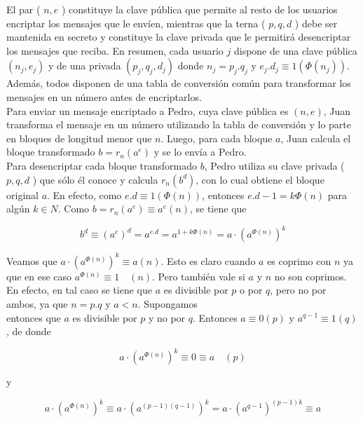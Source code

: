 \documentclass[10pt]{article}
\begin{document}
El par ( $n, e$ ) constituye la clave pública que permite al resto de los usuarios encriptar los mensajes que le envíen, mientras que la terna ( $p, q, d$ ) debe ser mantenida en secreto y constituye la clave privada que le permitirá desencriptar los mensajes que reciba. En resumen, cada usuario $j$ dispone de una clave pública $\left(n_{j}, e_{j}\right)$ y de una privada $\left(p_{j}, q_{j}, d_{j}\right)$ donde $n_{j}=p_{j} . q_{j}$ y $e_{j} . d_{j} \equiv 1\left(\Phi\left(n_{j}\right)\right)$. Además, todos disponen de una tabla de conversión común para transformar los mensajes en un número antes de encriptarlos.\\
Para enviar un mensaje encriptado a Pedro, cuya clave pública es $(n, e)$, Juan transforma el mensaje en un número utilizando la tabla de conversión y lo parte en bloques de longitud menor que $n$. Luego, para cada bloque $a$, Juan calcula el bloque transformado $b=r_{n}\left(a^{e}\right)$ y se lo envía a Pedro.\\
Para desencriptar cada bloque transformado $b$, Pedro utiliza su clave privada ( $p, q, d$ ) que sólo él conoce y calcula $r_{n}\left(b^{d}\right)$, con lo cual obtiene el bloque original $a$. En efecto, como $e . d \equiv 1(\Phi(n))$, entonces $e . d-1=k \Phi(n)$ para algún $k \in N$. Como $b=r_{n}\left(a^{e}\right) \equiv a^{e}(n)$, se tiene que


\begin{equation*}
b^{d} \equiv\left(a^{e}\right)^{d}=a^{e . d}=a^{1+k \Phi(n)}=a \cdot\left(a^{\Phi(n)}\right)^{k} \tag{n}
\end{equation*}


Veamos que $a \cdot\left(a^{\Phi(n)}\right)^{k} \equiv a(n)$. Esto es claro cuando $a$ es coprimo con $n$ ya que en ese caso $a^{\Phi(n)} \equiv 1 \quad(n)$. Pero también vale si $a$ y $n$ no son coprimos. En efecto, en tal caso se tiene que $a$ es divisible por $p$ o por $q$, pero no por ambos, ya que $n=p . q$ y $a<n$. Supongamos\\
entonces que $a$ es divisible por $p$ y no por $q$. Entonces $a \equiv 0(p)$ y $a^{q-1} \equiv 1(q)$, de donde

$$
a \cdot\left(a^{\Phi(n)}\right)^{k} \equiv 0 \equiv a \quad(p)
$$

y


\begin{equation*}
a \cdot\left(a^{\Phi(n)}\right)^{k} \equiv a \cdot\left(a^{(p-1)(q-1)}\right)^{k}=a \cdot\left(a^{q-1}\right)^{(p-1) k} \equiv a \tag{q}
\end{equation*}
\end{document}
